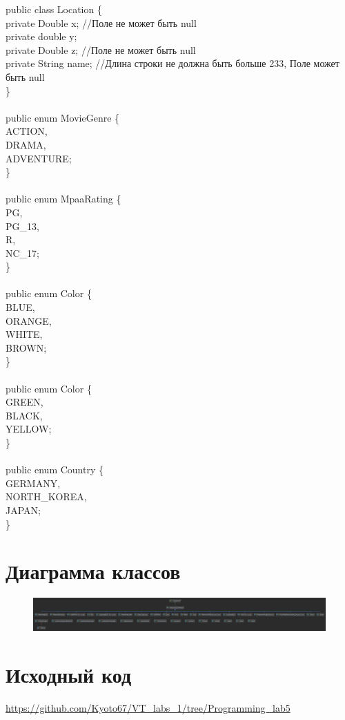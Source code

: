 {    public class Location \{ \\
    private Double x; //Поле не может быть null\\
    private double y;\\
    private Double z; //Поле не может быть null\\
    private String name; //Длина строки не должна быть больше 233, Поле может быть null\\
    \} \\
    \\
    public enum MovieGenre \{ \\
    ACTION,\\
    DRAMA,\\
    ADVENTURE;\\
    \} \\
    \\
    public enum MpaaRating \{ \\
    PG,\\
    PG\_13,\\
    R,\\
    NC\_17;\\
    \} \\
    \\
    public enum Color \{ \\
    BLUE,\\
    ORANGE,\\
    WHITE,\\
    BROWN;\\
    \} \\
    \\
    public enum Color \{ \\
    GREEN,\\
    BLACK,\\
    YELLOW;\\
    \} \\
    \\
    public enum Country \{ \\
    GERMANY,\\
    NORTH\_KOREA,\\
    JAPAN;\\
    \} \\
}
\newpage


\section{Диаграмма классов}

\begin{figure}[H]
    \includegraphics[scale=0.07]{img/diagram}
\end{figure}

\section{Исходный код}
\url{https://github.com/Kyoto67/VT_labs_1/tree/Programming_lab5}